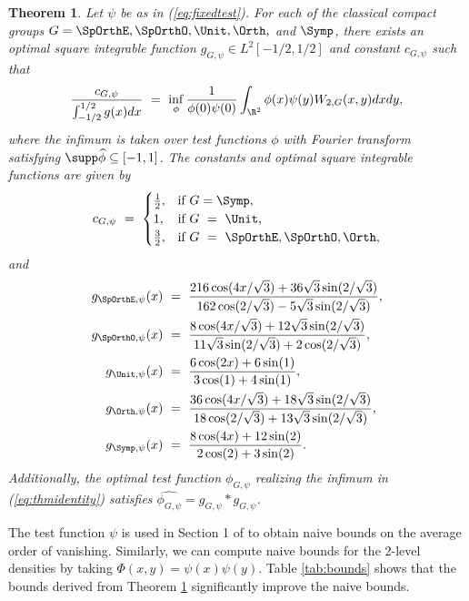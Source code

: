 \documentclass[12pt, reqno]{amsart}
\numberwithin{equation}{section}
\newtheorem{theorem}{Theorem}
\theoremstyle{definition}
\theoremstyle{remark}
\begin{document}
\begin{theorem}
	Let $\psi$ be as in (\ref{eq:fixedtest}). For each of the classical compact groups $G = \SpOrthE, \SpOrthO, \Unit, \Orth,$ and $\Symp$, there exists an optimal square integrable function $g_{G, \psi} \in L^2 [-1/2, 1/2]$ and constant $c_{G, \psi}$ such that
		\begin{equation}
			\frac{c_{G, \psi}}{\int_{-1/2}^{1/2} g(x) dx} \ = \  \inf_\phi  \frac{1}{\phi(0) \psi(0)} \int_{\R^2} \phi(x) \psi(y) W_{2, G} (x, y) dx dy, \label{eq:thmidentity} \end{equation}	
	where the infimum is taken over test functions $\phi$ with Fourier transform satisfying $\supp \widehat \phi \subseteq [-1, 1]$. The constants and optimal square integrable functions are given by
		\begin{equation}
			c_{G, \psi} \ = \
				\begin{cases}
					\frac12, 		&\text{if } G = \Symp,\\
					1, 				&\text{if } G \ = \  \Unit, \\
					\frac32,			&\text{if } G \ = \  \SpOrthE, \SpOrthO, \Orth,
				\end{cases}
		\end{equation}
	and
		\begin{align}
			g_{\SpOrthE, \psi} (x)
				&\ = \  \frac{216 \cos(4x/\sqrt 3) + 36 \sqrt 3 \sin(2/\sqrt 3)}{162 \cos(2/\sqrt 3) - 5 \sqrt{3} \sin(2/\sqrt 3)}, \\
			g_{\SpOrthO, \psi} (x) &\ = \  \frac{8 \cos (4 x/\sqrt{3})+12 \sqrt{3} \sin(2/\sqrt{3})}{11 \sqrt{3} \sin (2/\sqrt{3})+2 \cos(2/\sqrt{3})}, \\
			g_{\Unit, \psi} (x)
				&\ = \  \frac{6 \cos (2x) + 6 \sin(1)}{3 \cos(1) + 4 \sin(1)}, \\
			g_{\Orth, \psi} (x)
				&\ = \   \frac{36\cos(4x/\sqrt{3})+18\sqrt{3} \sin(2/\sqrt{3})}{18 \cos(2/\sqrt{3}) + 13 \sqrt{3} \sin(2/\sqrt{3})}, \\
			g_{\Symp, \psi} (x)
				&\ = \  \frac{8 \cos (4x) + 12 \sin(2)}{2 \cos (2) + 3 \sin(2)}.
		\end{align}	
	Additionally, the optimal test function $\phi_{G, \psi}$ realizing the infimum in (\ref{eq:thmidentity}) satisfies $\widehat{\phi_{G, \psi}} = g_{G, \psi} * g_{G, \psi}$.
		\label{thm:optimalgpsi}
\end{theorem}
The test function $\psi$ is used in Section 1 of \cite{ILS} to obtain naive bounds on the average order of vanishing. Similarly, we can compute naive bounds for the 2-level densities by taking $\Phi (x, y) = \psi(x) \psi(y)$. Table \ref{tab:bounds} shows that the bounds derived from Theorem \ref{thm:optimalgpsi} significantly improve the naive bounds.
\end{document}
